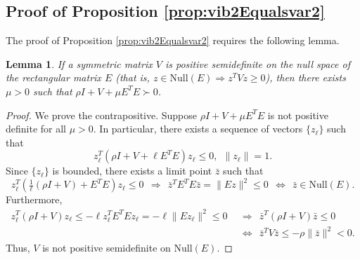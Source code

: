 \documentclass[12pt]{article}
\newtheorem{lemma}{Lemma}
\newcommand{\Null}{\mathrm{Null}}
\begin{document}
\begin{onehalfspace}
\subsection{Proof of Proposition \ref{prop:vib2Equalsvar2}}

The proof of Proposition \ref{prop:vib2Equalsvar2} requires
the following lemma. 

\begin{lemma} \label{lemma:existmu}
If a symmetric matrix $V$ is positive semidefinite on the null space of
the rectangular matrix $E$ (that is, $z \in \Null(E) \Rightarrow z^T V
z \ge 0$), then there exists $\mu > 0$ such that $\rho I + V + \mu E^TE
\succ 0$.
\end{lemma}

\begin{proof}
We prove the contrapositive. Suppose $\rho I + V + \mu E^TE$ is not
positive definite for all $\mu > 0$. In particular, there exists a
sequence of vectors $\{ z_\ell \}$ such that
\[
z_\ell^T(\rho I + V + \ell E^TE) z_\ell \le 0, \ \ \|z_\ell\| = 1.
\]
Since $\{ z_\ell \}$ is bounded, there exists a limit point $\bar z$ such
that
\[
z_\ell^T(\tfrac{1}{\ell} (\rho I + V) + E^TE)z_\ell \le 0
\ \ \Rightarrow \ \
\bar z^T E^T E \bar z = \| E z \|^2 \le 0
\ \ \Leftrightarrow \ \
\bar z \in \Null(E).
\]
Furthermore, 
\begin{align*}
z_\ell^T(\rho I + V) z_\ell \le -\ell z_\ell^TE^TEz_\ell = -\ell\|E z_\ell \|^2 \le 0
\ \ &\Rightarrow \ \
\bar z^T (\rho I + V) \bar z \le 0 \\
\ \ &\Leftrightarrow \ \
\bar z^T V \bar z \le -\rho \| \bar z\|^2 < 0.
\end{align*}
Thus, $V$ is not positive semidefinite on $\Null(E)$. 
\end{proof}


\end{onehalfspace}
\end{document}
